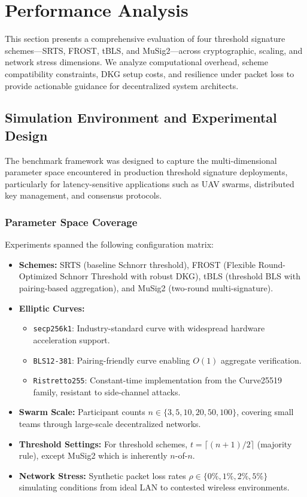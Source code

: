 \section{Performance Analysis}
\label{sec:performance_analysis}

This section presents a comprehensive evaluation of four threshold signature schemes---SRTS, FROST, tBLS, and MuSig2---across cryptographic, scaling, and network stress dimensions. We analyze computational overhead, scheme compatibility constraints, DKG setup costs, and resilience under packet loss to provide actionable guidance for decentralized system architects.

\subsection{Simulation Environment and Experimental Design}
\label{subsec:simulation_env}

The benchmark framework was designed to capture the multi-dimensional parameter space encountered in production threshold signature deployments, particularly for latency-sensitive applications such as UAV swarms, distributed key management, and consensus protocols.

\subsubsection{Parameter Space Coverage}

Experiments spanned the following configuration matrix:
\begin{itemize}
    \item \textbf{Schemes:} SRTS (baseline Schnorr threshold), FROST (Flexible Round-Optimized Schnorr Threshold with robust DKG), tBLS (threshold BLS with pairing-based aggregation), and MuSig2 (two-round multi-signature).
    \item \textbf{Elliptic Curves:} 
    \begin{itemize}
        \item \texttt{secp256k1}: Industry-standard curve with widespread hardware acceleration support.
        \item \texttt{BLS12-381}: Pairing-friendly curve enabling $O(1)$ aggregate verification.
        \item \texttt{Ristretto255}: Constant-time implementation from the Curve25519 family, resistant to side-channel attacks.
    \end{itemize}
    \item \textbf{Swarm Scale:} Participant counts $n \in \{3, 5, 10, 20, 50, 100\}$, covering small teams through large-scale decentralized networks.
    \item \textbf{Threshold Settings:} For threshold schemes, $t = \lceil (n+1)/2 \rceil$ (majority rule), except MuSig2 which is inherently $n$-of-$n$.
    \item \textbf{Network Stress:} Synthetic packet loss rates $\rho \in \{0\%, 1\%, 2\%, 5\%\}$ simulating conditions from ideal LAN to contested wireless environments.
\end{itemize}

